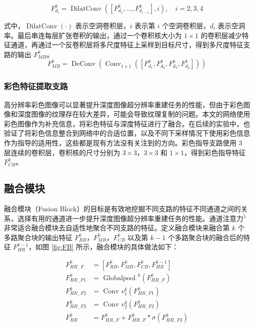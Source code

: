 \documentclass{vip-theme}
\begin{document}
\begin{equation}
F_{d_{i}}^{k}=\operatorname{DilatConv}\left(\left[F_{d_{1}}^{k}, \ldots, F_{d_{i-1}}^{k}\right], i\right), \quad i=2,3,4
\end{equation}

式中，$\operatorname{DilatConv}(\cdot)$ 表示空洞卷积层，$i$ 表示第 $i$ 个空洞卷积层，$d_i$ 表示空洞率。最后串连每层扩张卷积的输出，通过一个卷积核大小为 $1\times 1$ 的卷积层减少特征通道，再通过一个反卷积层将多尺度特征上采样到目标尺寸，得到多尺度特征支路的输出 $F_{M B}^{k}$。
\begin{equation}
F_{M B}^{k}=\operatorname{DeConv}\left(\operatorname{Conv}_{1 \times 1}\left(\left[F_{d_{1}}^{k}, F_{d_{2}}^{k}, F_{d_{3}}^{k}, F_{d_{4}}^{k}\right]\right)\right)
\end{equation}

\subsubsection{彩色特征提取支路}

高分辨率彩色图像可以显著提升深度图像超分辨率重建任务的性能，但由于彩色图像和深度图像的纹理存在较大差异，可能会导致纹理复制的问题。本文的网络使用彩色图像作为补充信息，将彩色特征与深度特征进行了融合。在后续的实验中，也验证了将彩色信息整合到网络中的合适位置，以及不同下采样情况下使用彩色信息作为指导的适用性，这些都是现有方法没有关注到的方向。彩色指导支路使用 3 层连续的卷积层，卷积核的尺寸分别为 $3\times 3$，$3\times 3$ 和 $1\times 1$，得到彩色指导特征 $F_{CB}^k$。



\subsection{融合模块}
融合模块（Fusion Block）的目标是有效地挖掘不同支路的特征不同通道之间的关系，选择有用的通道进一步提升深度图像超分辨率重建任务的性能。通道注意力$^5$非常适合融合模块去自适性地聚合不同支路的特征。定义融合模块来融合第 $k$ 个多路聚合块的输出特征 $F_{RB}^k$，$F_{MB}^k$，$F_{CB}^k$ 以及第 $k-1$ 个多路聚合块的融合后的特征 $F_{HR}^{k-1}$，如图 \ref{fig:FB} 所示，融合模块的具体做法如下：

\begin{equation}
\begin{aligned}
F_{H R_{-} F}^{k} &=\left[F_{R B}^{k}, F_{M B}^{k}, F_{C B}^{k}, F_{H R}^{k-1}\right] \\
F_{H R_{-} F 1}^{k} &=\text { Globalpool }^{k}\left(F_{H R_{-} F}^{k}\right) \\
F_{H R_{-} F 2}^{k} &=\text { Conv } v_{1}^{k}\left(F_{H R_{-} F 1}^{k}\right) \\
F_{H R_{-} F 3}^{k} &=\text { Conv } v_{2}^{k}\left(F_{H R_{-} F 2}^{k}\right) \\
F_{H R}^{k} &=F_{H R_{-} F}^{k}+F_{H R_{-} F}^{k} * \sigma\left(F_{H R_{-} F 3}^{k}\right)
\end{aligned}
\end{equation}
\end{document}
